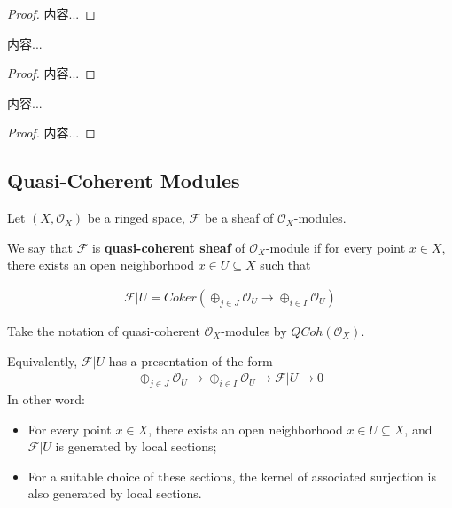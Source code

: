 \documentclass[Total.tex]{subfiles}
\begin{document}
				\begin{proof}
					内容...
				\end{proof}
				
				\begin{lemma}
					内容...
				\end{lemma}
				
				\begin{proof}
					内容...
				\end{proof}
				
				\begin{lemma}
					内容...
				\end{lemma}
				
				\begin{proof}
					内容...
				\end{proof}
			
			\subsection{Quasi-Coherent Modules}
			
			\begin{Def}
				Let $(X,\mathcal{O}_X)$ be a ringed space, $\mathcal{F}$ be a sheaf of $\mathcal{O}_X$-modules. 
				
				We say that $\mathcal{F}$ is \textbf{quasi-coherent sheaf} of $\mathcal{O}_X$-module if for every point $x\in X$, there exists an open neighborhood $x\in U\subseteq X$ such that
				
				\begin{gather*}
					\mathcal{F}|U=Coker(\oplus_{j\in J} \mathcal{O}_U\rightarrow \oplus_{i\in I} \mathcal{O}_U)
				\end{gather*}
				
				Take the notation of quasi-coherent $\mathcal{O}_X$-modules by $QCoh(\mathcal{O}_X)$.
			\end{Def}
			Equivalently, $\mathcal{F}|U$ has a presentation of the form
			\begin{gather*}
				\oplus_{j\in J} \mathcal{O}_U\rightarrow \oplus_{i\in I} \mathcal{O}_U\rightarrow \mathcal{F}|U\rightarrow 0
			\end{gather*}
			In other word:
			\begin{itemize}
				\item For every point $x\in X$, there exists an open neighborhood $x\in U\subseteq X$, and $\mathcal{F}|U$ is generated by local sections;
				\item For a suitable choice of these sections, the kernel of associated surjection is also generated by local sections.
			\end{itemize}
\end{document}
